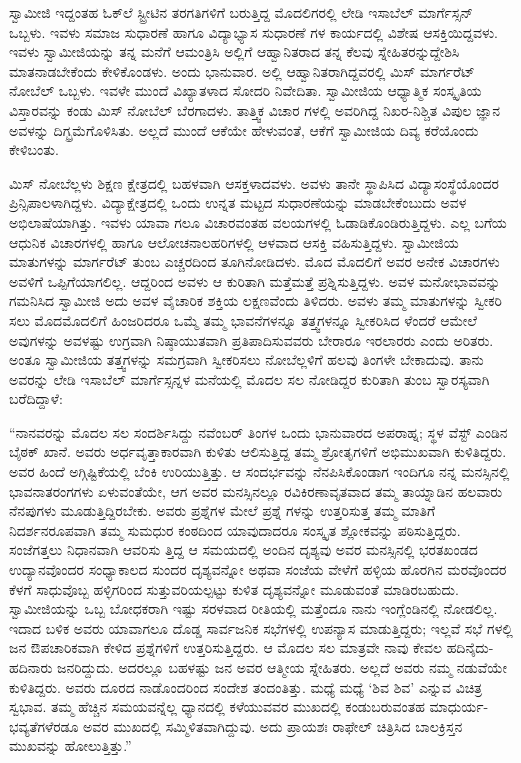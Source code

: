 ಸ್ವಾಮೀಜಿ ಇದ್ದಂತಹ ಓಕ್​ಲೆ ಸ್ಟ್ರೀಟಿನ ತರಗತಿಗಳಿಗೆ ಬರುತ್ತಿದ್ದ ಮೊದಲಿಗರಲ್ಲಿ ಲೇಡಿ ಇಸಾಬೆಲ್ ಮಾರ್ಗೆಸ್ಸನ್ ಒಬ್ಬಳು. ಇವಳು ಸಮಾಜ ಸುಧಾರಣೆ ಹಾಗೂ ವಿದ್ಯಾಭ್ಯಾಸ ಸುಧಾರಣೆ ಗಳ ಕಾರ್ಯದಲ್ಲಿ ವಿಶೇಷ ಆಸಕ್ತಿಯಿದ್ದವಳು. ಇವಳು ಸ್ವಾಮೀಜಿಯನ್ನು ತನ್ನ ಮನೆಗೆ ಆಮಂತ್ರಿಸಿ ಅಲ್ಲಿಗೆ ಆಹ್ವಾನಿತರಾದ ತನ್ನ ಕೆಲವು ಸ್ನೇಹಿತರನ್ನುದ್ದೇಶಿಸಿ ಮಾತನಾಡಬೇಕೆಂದು ಕೇಳಿಕೊಂಡಳು. ಅಂದು ಭಾನುವಾರ. ಅಲ್ಲಿ ಆಹ್ವಾನಿತರಾಗಿದ್ದವರಲ್ಲಿ ಮಿಸ್ ಮಾರ್ಗರೆಟ್ ನೋಬೆಲ್ ಒಬ್ಬಳು. ಇವಳೇ ಮುಂದೆ ವಿಖ್ಯಾತಳಾದ ಸೋದರಿ ನಿವೇದಿತಾ. ಸ್ವಾಮೀಜಿಯ ಆಧ್ಯಾತ್ಮಿಕ ಸಂಸ್ಕೃತಿಯ ವಿಸ್ತಾರವನ್ನು ಕಂಡು ಮಿಸ್ ನೋಬೆಲ್ ಬೆರಗಾದಳು. ತಾತ್ತ್ವಿಕ ವಿಚಾರ ಗಳಲ್ಲಿ ಅವರಿಗಿದ್ದ ನಿಖರ-ನಿಶ್ಚಿತ ವಿಪುಲ ಜ್ಞಾನ ಅವಳನ್ನು ದಿಗ್ಭ್ರಮೆಗೊಳಿಸಿತು. ಅಲ್ಲದೆ ಮುಂದೆ ಆಕೆಯೇ ಹೇಳುವಂತೆ, ಆಕೆಗೆ ಸ್ವಾಮೀಜಿಯ ದಿವ್ಯ ಕರೆಯೊಂದು ಕೇಳಿಬಂತು.

ಮಿಸ್ ನೋಬೆಲ್ಲಳು ಶಿಕ್ಷಣ ಕ್ಷೇತ್ರದಲ್ಲಿ ಬಹಳವಾಗಿ ಆಸಕ್ತಳಾದವಳು. ಅವಳು ತಾನೇ ಸ್ಥಾಪಿಸಿದ ವಿದ್ಯಾಸಂಸ್ಥೆಯೊಂದರ ಪ್ರಿನ್ಸಿಪಾಲಳಾಗಿದ್ದಳು. ವಿದ್ಯಾಕ್ಷೇತ್ರದಲ್ಲಿ ಒಂದು ಉನ್ನತ ಮಟ್ಟದ ಸುಧಾರಣೆಯನ್ನು ಮಾಡಬೇಕೆಂಬುದು ಅವಳ ಅಭಿಲಾಷೆಯಾಗಿತ್ತು. ಇವಳು ಯಾವಾ ಗಲೂ ವಿಚಾರವಂತಹ ವಲಯಗಳಲ್ಲಿ ಓಡಾಡಿಕೊಂಡಿರುತ್ತಿದ್ದಳು. ಎಲ್ಲ ಬಗೆಯ ಆಧುನಿಕ ವಿಚಾರಗಳಲ್ಲಿ ಹಾಗೂ ಆಲೋಚನಾಲಹರಿಗಳಲ್ಲಿ ಆಳವಾದ ಆಸಕ್ತಿ ವಹಿಸುತ್ತಿದ್ದಳು. ಸ್ವಾಮೀಜಿಯ ಮಾತುಗಳನ್ನು ಮಾರ್ಗರೆಟ್ ತುಂಬ ಎಚ್ಚರದಿಂದ ತೂಗಿನೋಡಿದಳು. ಮೊದ ಮೊದಲಿಗೆ ಅವರ ಅನೇಕ ವಿಚಾರಗಳು ಅವಳಿಗೆ ಒಪ್ಪಿಗೆಯಾಗಲಿಲ್ಲ. ಆದ್ದರಿಂದ ಅವಳು ಆ ಕುರಿತಾಗಿ ಮತ್ತೆಮತ್ತೆ ಪ್ರಶ್ನಿಸುತ್ತಿದ್ದಳು. ಅವಳ ಮನೋಭಾವವನ್ನು ಗಮನಿಸಿದ ಸ್ವಾಮೀಜಿ ಅದು ಅವಳ ವೈಚಾರಿಕ ಶಕ್ತಿಯ ಲಕ್ಷಣವೆಂದು ತಿಳಿದರು. ಅವಳು ತಮ್ಮ ಮಾತುಗಳನ್ನು ಸ್ವೀಕರಿ ಸಲು ಮೊದಮೊದಲಿಗೆ ಹಿಂಜರಿದರೂ ಒಮ್ಮೆ ತಮ್ಮ ಭಾವನೆಗಳನ್ನೂ ತತ್ತ್ವಗಳನ್ನೂ ಸ್ವೀಕರಿಸಿದ ಳೆಂದರೆ ಆಮೇಲೆ ಅವುಗಳನ್ನು ಅವಳಷ್ಟು ಉಗ್ರವಾಗಿ ನಿಷ್ಠಾಯುತವಾಗಿ ಪ್ರತಿಪಾದಿಸುವವರು ಬೇರಾರೂ ಇರಲಾರರು ಎಂದು ಅರಿತರು. ಅಂತೂ ಸ್ವಾಮೀಜಿಯ ತತ್ತ್ವಗಳನ್ನು ಸಮಗ್ರವಾಗಿ ಸ್ವೀಕರಿಸಲು ನೋಬೆಲ್ಲಳಿಗೆ ಹಲವು ತಿಂಗಳೇ ಬೇಕಾದುವು. ತಾನು ಅವರನ್ನು ಲೇಡಿ ಇಸಾಬೆಲ್ ಮಾರ್ಗೆಸ್ಸನ್ನಳ ಮನೆಯಲ್ಲಿ ಮೊದಲ ಸಲ ನೋಡಿದ್ದರ ಕುರಿತಾಗಿ ತುಂಬ ಸ್ವಾರಸ್ಯವಾಗಿ ಬರೆದಿದ್ದಾಳೆ:

“ನಾನವರನ್ನು ಮೊದಲ ಸಲ ಸಂದರ್ಶಿಸಿದ್ದು ನವೆಂಬರ್ ತಿಂಗಳ ಒಂದು ಭಾನುವಾರದ ಅಪರಾಹ್ನ; ಸ್ಥಳ ವೆಸ್ಟ್ ಎಂಡಿನ ಬೈಠಕ್ ಖಾನೆ. ಅವರು ಅರ್ಧವೃತ್ತಾಕಾರವಾಗಿ ಕುಳಿತು ಆಲಿಸುತ್ತಿದ್ದ ತಮ್ಮ ಶ್ರೋತೃಗಳಿಗೆ ಅಭಿಮುಖವಾಗಿ ಕುಳಿತಿದ್ದರು. ಅವರ ಹಿಂದೆ ಅಗ್ಗಿಷ್ಟಿಕೆಯಲ್ಲಿ ಬೆಂಕಿ ಉರಿಯುತ್ತಿತ್ತು. ಆ ಸಂದರ್ಭವನ್ನು ನೆನಪಿಸಿಕೊಂಡಾಗ ಇಂದಿಗೂ ನನ್ನ ಮನಸ್ಸಿನಲ್ಲಿ ಭಾವನಾತರಂಗಗಳು ಏಳುವಂತೆಯೇ, ಆಗ ಅವರ ಮನಸ್ಸಿನಲ್ಲೂ ರವಿಕಿರಣಾವೃತವಾದ ತಮ್ಮ ತಾಯ್ನಾಡಿನ ಹಲವಾರು ನೆನಪುಗಳು ಮೂಡುತ್ತಿದ್ದಿರಬೇಕು. ಅವರು ಪ್ರಶ್ನೆಗಳ ಮೇಲೆ ಪ್ರಶ್ನೆ ಗಳನ್ನು ಉತ್ತರಿಸುತ್ತ ತಮ್ಮ ಮಾತಿಗೆ ನಿದರ್ಶನರೂಪವಾಗಿ ತಮ್ಮ ಸುಮಧುರ ಕಂಠದಿಂದ ಯಾವುದಾದರೂ ಸಂಸ್ಕೃತ ಶ್ಲೋಕವನ್ನು ಪಠಿಸುತ್ತಿದ್ದರು. ಸಂಜೆಗತ್ತಲು ನಿಧಾನವಾಗಿ ಆವರಿಸು ತ್ತಿದ್ದ ಆ ಸಮಯದಲ್ಲಿ ಅಂದಿನ ದೃಶ್ಯವು ಅವರ ಮನಸ್ಸಿನಲ್ಲಿ ಭರತಖಂಡದ ಉದ್ಯಾನವೊಂದರ ಸಂಧ್ಯಾಕಾಲದ ಸುಂದರ ದೃಶ್ಯವನ್ನೋ ಅಥವಾ ಸಂಜೆಯ ವೇಳೆಗೆ ಹಳ್ಳಿಯ ಹೊರಗಿನ ಮರವೊಂದರ ಕೆಳಗೆ ಸಾಧುವೊಬ್ಬ ಹಳ್ಳಿಗರಿಂದ ಸುತ್ತುವರಿಯಲ್ಪಟ್ಟು ಕುಳಿತ ದೃಶ್ಯವನ್ನೋ ಮೂಡುವಂತೆ ಮಾಡಿರಬಹುದು. ಸ್ವಾಮೀಜಿಯನ್ನು ಒಬ್ಬ ಬೋಧಕರಾಗಿ ಇಷ್ಟು ಸರಳವಾದ ರೀತಿಯಲ್ಲಿ ಮತ್ತೆಂದೂ ನಾನು ಇಂಗ್ಲೆಂಡಿನಲ್ಲಿ ನೋಡಲಿಲ್ಲ. ಇದಾದ ಬಳಿಕ ಅವರು ಯಾವಾಗಲೂ ದೊಡ್ಡ ಸಾರ್ವಜನಿಕ ಸಭೆಗಳಲ್ಲಿ ಉಪನ್ಯಾಸ ಮಾಡುತ್ತಿದ್ದರು; ಇಲ್ಲವೆ ಸಭೆ ಗಳಲ್ಲಿ ಜನ ಔಪಚಾರಿಕವಾಗಿ ಕೇಳಿದ ಪ್ರಶ್ನೆಗಳಿಗೆ ಉತ್ತರಿಸುತ್ತಿದ್ದರು. ಆ ಮೊದಲ ಸಲ ಮಾತ್ರವೇ ನಾವು ಕೇವಲ ಹದಿನೈದು-ಹದಿನಾರು ಜನರಿದ್ದುದು. ಅದರಲ್ಲೂ ಬಹಳಷ್ಟು ಜನ ಅವರ ಆತ್ಮೀಯ ಸ್ನೇಹಿತರು. ಅಲ್ಲದೆ ಅವರು ನಮ್ಮ ನಡುವೆಯೇ ಕುಳಿತಿದ್ದರು. ಅವರು ದೂರದ ನಾಡೊಂದರಿಂದ ಸಂದೇಶ ತಂದಂತಿತ್ತು. ಮಧ್ಯೆ ಮಧ್ಯೆ ‘ಶಿವ ಶಿವ’ ಎನ್ನುವ ವಿಚಿತ್ರ ಸ್ವಭಾವ. ತಮ್ಮ ಹೆಚ್ಚಿನ ಸಮಯವನ್ನೆಲ್ಲ ಧ್ಯಾನದಲ್ಲಿ ಕಳೆಯುವವರ ಮುಖದಲ್ಲಿ ಕಂಡುಬರುವಂತಹ ಮಾಧುರ್ಯ-ಭವ್ಯತೆಗಳೆರಡೂ ಅವರ ಮುಖದಲ್ಲಿ ಸಮ್ಮಿಳಿತವಾಗಿದ್ದುವು. ಅದು ಪ್ರಾಯಶಃ ರಾಫೇಲ್ ಚಿತ್ರಿಸಿದ ಬಾಲಕ್ರಿಸ್ತನ ಮುಖವನ್ನು ಹೋಲುತ್ತಿತ್ತು.”

